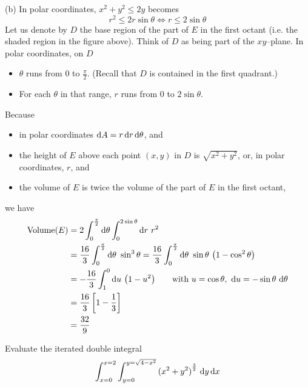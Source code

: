 \begin{solution}
(b) In polar coordinates, $x^2 + y^2 \le 2y$ becomes
\begin{equation*}
r^2\le 2r\sin\theta 
\iff 
r\le 2\sin\theta
\end{equation*}
Let us denote by $D$ the base region of the part of $E$ in the first 
octant (i.e. the shaded region in the figure above). Think of $D$ as being
part of the $xy$--plane. In polar coordinates, on $D$
\begin{itemize}
\item 
$\theta$ runs from $0$ to $\frac{\pi}{2}$. (Recall that $D$ is 
contained in the first quadrant.)
\item
For each $\theta$ in that range, $r$ runs from $0$ to $2\sin\theta$.
\end{itemize}
Because
\begin{itemize}
\item
in polar coordinates $\mathrm{d}A = r\,\mathrm{d}r\,\mathrm{d}\theta$, and
\item 
the height of $E$ above each point $(x,y)$ in $D$ is $\sqrt{x^2+y^2}$,
or, in polar coordinates, $r$, and
\item 
the volume of $E$ is twice the volume of the part of $E$ in the first octant,
\end{itemize}
we have
\begin{align*}
\text{Volume}(E)
&= 2\int_0^{\frac{\pi}{2}}\dee{\theta} \int_0^{2\sin\theta}\dee{r}\ r^2 \\
&=\frac{16}{3} \int_0^{\frac{\pi}{2}}\dee{\theta}\ \sin^3\theta 
=\frac{16}{3} \int_0^{\frac{\pi}{2}}\dee{\theta}\ 
                  \sin\theta\ \big(1-\cos^2\theta\big) \\
&=-\frac{16}{3} \int_1^0\dee{u}\ \big(1-u^2\big)\qquad
\text{with }u=\cos\theta,\ \dee{u}=-\sin\theta\ \dee{\theta} \\
&=\frac{16}{3}\left[1-\frac{1}{3}\right] \\
&=\frac{32}{9}
\end{align*}
\end{solution}

\begin{question}[M200 2006A] %
Evaluate the iterated double integral
\begin{equation*}
\int_{x=0}^{x=2}\int_{y=0}^{y=\sqrt{4-x^2}} {(x^2+y^2)}^{\frac{3}{2}}\ \mathrm{d}y\,\mathrm{d}x
\end{equation*}
\end{question}

%

